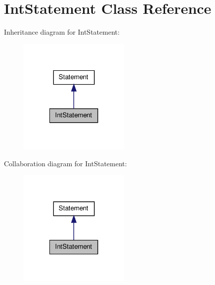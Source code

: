 \hypertarget{class_int_statement}{\section{Int\-Statement Class Reference}
\label{class_int_statement}
}


Inheritance diagram for Int\-Statement\-:
\nopagebreak
\begin{figure}[H]
\begin{center}
\leavevmode
\includegraphics[width=152pt]{class_int_statement__inherit__graph}
\end{center}
\end{figure}


Collaboration diagram for Int\-Statement\-:
\nopagebreak
\begin{figure}[H]
\begin{center}
\leavevmode
\includegraphics[width=152pt]{class_int_statement__coll__graph}
\end{center}
\end{figure}
